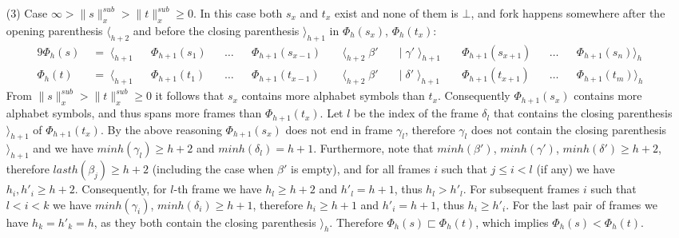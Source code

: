 \documentclass[AMA,STIX1COL]{WileyNJD-v2}
\newcommand{\Xl}{\langle}
\newcommand{\Xr}{\rangle}
\newcommand{\snorm}[2]{\|{#1}\|^{sub}_{#2}}
\begin{document}
\begin{proofEnd}
\begin{itemize}[itemsep=0.2em, topsep=0.5em]
    \item[(3)]
        Case $\infty > \snorm{s}{x} > \snorm{t}{x} \geq 0$.
        In this case both $s_x$ and $t_x$ exist and none of them is $\bot$,
        and fork happens somewhere after the opening parenthesis $\Xl_{h+2}$
        and before the closing parenthesis $\Xr_{h+1}$ in $\Phi_{h}(s_x)$, $\Phi_{h}(t_x)$:
        \begin{alignat*}{9}
            \Phi_{h}(s) &\;=\; \Xl_{h+1} &&\Phi_{h+1}(s_1) &&\dots &&\Phi_{h+1}(s_{x-1}) &&\; \Xl_{h+2} \; \beta'
                &&\;\big|\; \gamma' \; \Xr_{h+1} \; &&\Phi_{h+1}(s_{x+1}) &&\dots &&\Phi_{h+1}(s_n) \Xr_{h} \\[-0.5em]
            \Phi_{h}(t) &\;=\; \Xl_{h+1} &&\Phi_{h+1}(t_1) &&\dots &&\Phi_{h+1}(t_{x-1}) &&\; \Xl_{h+2} \; \beta'
                &&\;\big|\; \delta' \; \Xr_{h+1} \; &&\Phi_{h+1}(t_{x+1}) &&\dots &&\Phi_{h+1}(t_m) \Xr_{h}
        \end{alignat*}
        From $\snorm{s}{x} > \snorm{t}{x} \geq 0$ it follows that
        $s_x$ contains more alphabet symbols than $t_x$.
        Consequently $\Phi_{h+1}(s_x)$ contains more alphabet symbols, and thus spans more frames than $\Phi_{h+1}(t_x)$.
        Let $l$ be the index of the frame $\delta_l$ that contains the closing parenthesis $\Xr_{h+1}$ of $\Phi_{h+1}(t_x)$.
        By the above reasoning $\Phi_{h+1}(s_x)$ does not end in frame $\gamma_l$,
        therefore $\gamma_l$ does not contain the closing parenthesis $\Xr_{h+1}$
        and we have $minh (\gamma_l) \geq h+2$ and $minh (\delta_l) = h+1$.
        Furthermore, note that $minh(\beta')$, $minh(\gamma')$, $minh(\delta') \geq h + 2$,
        therefore $lasth(\beta_j) \geq h+2$ (including the case when $\beta'$ is empty),
        and for all frames $i$ such that $j \leq i < l$ (if any) we have $h_i, h'_i \geq h+2$.
        Consequently, for $l$-th frame we have $h_l \geq h+2$ and $h'_l = h + 1$, thus $h_l > h'_l$.
        For subsequent frames $i$ such that $l < i < k$ we have $minh(\gamma_i)$, $minh(\delta_i) \geq h + 1$,
        therefore $h_i \geq h+1$ and $h'_i = h + 1$, thus $h_i \geq h'_i$.
        For the last pair of frames we have $h_k = h'_k = h$, as they both contain the closing parenthesis $\Xr_{h}$.
        Therefore $\Phi_{h}(s) \sqsubset \Phi_{h}(t)$,
        which implies $\Phi_{h}(s) < \Phi_{h}(t)$.
    \end{itemize}
\end{proofEnd}
\end{document}
